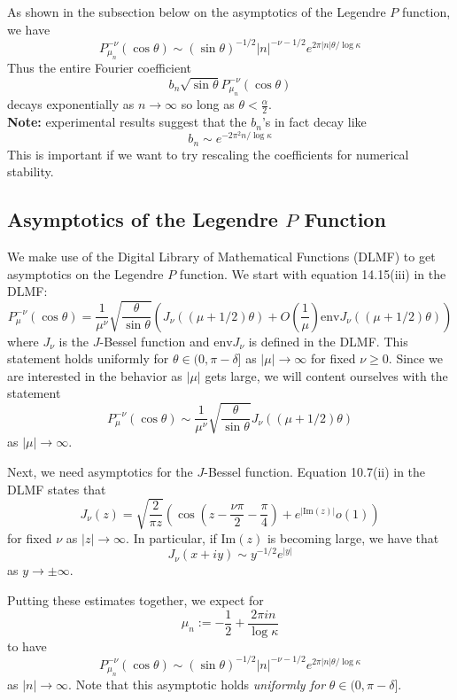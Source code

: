 \documentclass[]{article}
\begin{document}
As shown in the subsection below on the asymptotics of the Legendre $P$ function, we have
$$
P_{\mu_n}^{-\nu}(\cos\theta) \sim (\sin\theta)^{-1/2}|n|^{-\nu-1/2}e^{2\pi|n|\theta/\log\kappa}
$$
Thus the entire Fourier coefficient
$$
b_n\sqrt{\sin\theta}P_{\mu_n}^{-\nu}(\cos\theta)
$$
decays exponentially as $n \rightarrow \infty$ so long as $\theta < \frac{\alpha}{2}$.
\\

\textbf{Note:} experimental results suggest that the $b_n$'s in fact decay like
$$
b_n \sim e^{-2\pi^2n/\log\kappa}
$$
This is important if we want to try rescaling the coefficients for numerical stability.

\subsection*{Asymptotics of the Legendre $P$ Function}

We make use of the Digital Library of Mathematical Functions (DLMF) to get asymptotics on the Legendre $P$ function.
We start with equation 14.15(iii) in the DLMF:
$$
P_\mu^{-\nu}(\cos\theta) = \frac{1}{\mu^\nu}\sqrt{\frac{\theta}{\sin\theta}}\left( J_\nu((\mu+1/2)\theta) + O\left( \frac{1}{\mu} \right)\text{env}J_\nu((\mu+1/2)\theta) \right)
$$
where $J_\nu$ is the $J$-Bessel function and $\text{env}J_\nu$ is defined in the DLMF.
This statement holds uniformly for $\theta \in (0, \pi - \delta]$ as $|\mu| \rightarrow \infty$ for fixed $\nu \geq 0$.
Since we are interested in the behavior as $|\mu|$ gets large, we will content ourselves with the statement
$$
P_\mu^{-\nu}(\cos\theta) \sim \frac{1}{\mu^\nu}\sqrt{\frac{\theta}{\sin\theta}}J_\nu((\mu+1/2)\theta)
$$
as $|\mu| \rightarrow \infty$.

Next, we need asymptotics for the $J$-Bessel function.
Equation 10.7(ii) in the DLMF states that
$$
J_\nu(z) = \sqrt{\frac{2}{\pi z}}\left( \cos\left(z - \frac{\nu\pi}{2} - \frac{\pi}{4}\right) + e^{|\text{Im}(z)|}o(1) \right)
$$
for fixed $\nu$ as $|z| \rightarrow \infty$.
In particular, if $\text{Im}(z)$ is becoming large, we have that
$$
J_\nu(x + iy) \sim y^{-1/2}e^{|y|}
$$
as $y \rightarrow \pm\infty$.

Putting these estimates together, we expect for
$$
\mu_n := -\frac{1}{2} + \frac{2\pi in}{\log\kappa}
$$
to have
\begin{equation}\label{legPAsymptotic}
P_{\mu_n}^{-\nu}(\cos\theta) \sim (\sin\theta)^{-1/2}|n|^{-\nu-1/2}e^{2\pi|n|\theta/\log\kappa}
\end{equation}
as $|n| \rightarrow \infty$.
Note that this asymptotic holds \textit{uniformly for} $\theta \in (0, \pi - \delta]$.
\end{document}

